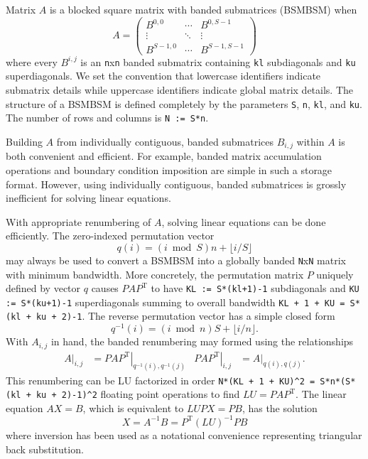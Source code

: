 \documentclass[letterpaper,11pt,nointlimits,reqno]{amsart}
\begin{document}
Matrix $A$ is a blocked square matrix with banded submatrices (BSMBSM)
when
\[A = \begin{pmatrix}
    B^{0,0}  & \cdots & B^{0,S-1}   \\
    \vdots    & \ddots & \vdots       \\
    B^{S-1,0} & \cdots & B^{S-1,S-1}
\end{pmatrix}\]
where every $B^{i,j}$ is an \texttt{n}x\texttt{n} banded submatrix containing
\texttt{kl} subdiagonals and \texttt{ku} superdiagonals.  We set the convention
that lowercase identifiers indicate submatrix details while uppercase
identifiers indicate global matrix details.  The structure of a BSMBSM is
defined completely by the parameters \texttt{S}, \texttt{n}, \texttt{kl}, and
\texttt{ku}.  The number of rows and columns is \texttt{N := S*n}.

Building $A$ from individually contiguous, banded submatrices $B_{i,j}$ within
$A$ is both convenient and efficient.  For example, banded matrix accumulation
operations and boundary condition imposition are simple in such a storage
format.  However, using individually contiguous, banded submatrices is grossly
inefficient for solving linear equations.

With appropriate renumbering of $A$, solving linear equations can be done
efficiently.  The zero-indexed permutation vector \[q(i) =
\left(i\bmod{}S\right)n + \lfloor{}i/S\rfloor{}\] may always be used to convert
a BSMBSM into a globally banded \texttt{N}x\texttt{N} matrix with minimum
bandwidth.  More concretely, the permutation matrix $P$ uniquely defined by
vector $q$ causes $P A P^{\mbox{T}}$ to have \texttt{KL := S*(kl+1)-1}
subdiagonals and \texttt{KU := S*(ku+1)-1} superdiagonals summing to overall
bandwidth \texttt{KL + 1 + KU = S*(kl + ku + 2)-1}.  The reverse permutation
vector has a simple closed form \[q^{-1}(i) = \left(i\bmod{}n\right)S +
\lfloor{}i/n\rfloor{}.\] With $A_{i,j}$ in hand, the banded renumbering may
formed using the relationships
\begin{align*}
       \left.A\right|_{i,j}
    &= \left.P A P^{\mbox{T}}\right|_{q^{-1}(i),q^{-1}(j)}
    &
       \left.P A P^{\mbox{T}}\right|_{i,j}
    &= \left.A\right|_{q(i),q(j)}.
\end{align*}
This renumbering can be LU factorized in order
\verb|N*(KL + 1 + KU)^2 = S*n*(S*(kl + ku + 2)-1)^2|
floating point operations to find $LU = P A
P^{\mbox{T}}$.  The linear equation $AX=B$, which is equivalent to $LUPX=PB$,
has the solution \[X = A^{-1}B = P^{\mbox{T}}\left(LU\right)^{-1}PB\] where
inversion has been used as a notational convenience representing triangular
back substitution.
\end{document}
